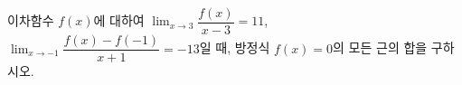 이차함수 $f(x)$에 대하여 $\displaystyle\lim_{x\to 3}\dfrac{f(x)}{x-3}=11$, $\displaystyle\lim_{x\to -1}\dfrac{f(x)-f(-1)}{x+1}=-13$일 때, 방정식 $f(x)=0$의 모든 근의 합을 구하시오.
